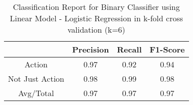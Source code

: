 \documentclass[11pt,letterpaper]{article}
\begin{document}
\begin{table}
\caption{Classification Report for Binary Classifier using Linear Model - Logistic Regression in k-fold cross validation (k=6)} \label{Classification Report for Binary Classifier using Linear Model - Logistic Regression}
\begin{center}
\begin{tabular}{ |c|c|c|c| } 
 \hline
  & Precision & Recall & F1-Score \\ 
 \hline
 Action & 0.97 & 0.92 & 0.94 \\ 
 Not Just Action & 0.98 & 0.99 & 0.98 \\ 
 Avg/Total & 0.97 & 0.97 & 0.97 \\
 \hline
\end{tabular}
\end{center}
\end{table}
\end{document}
